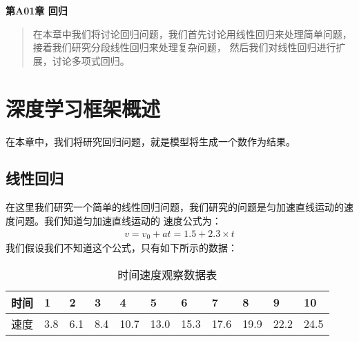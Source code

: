 \newpage
\maketitle
\begin{center}
\Large \textbf{第A01章 回归} \quad 
\end{center}
\begin{abstract}
在本章中我们将讨论回归问题，我们首先讨论用线性回归来处理简单问题，接着我们研究分段线性回归来处理复杂问题，
然后我们对线性回归进行扩展，讨论多项式回归。
\end{abstract}
\section{深度学习框架概述}
在本章中，我们将研究回归问题，就是模型将生成一个数作为结果。
\subsection{线性回归}
在这里我们研究一个简单的线性回归问题，我们研究的问题是匀加速直线运动的速度问题。我们知道匀加速直线运动的
速度公式为：
\begin{equation}
	\begin{aligned}
	v = v_{0} + at = 1.5 + 2.3 \times t
	\end{aligned}
	\label{chpA01-volacity-yjszxyd}
\end{equation}
我们假设我们不知道这个公式，只有如下所示的数据：
\begin{table}[h]
	\caption{时间速度观察数据表}
	\label{chpA01-tbl-v-t}
	\begin{spacing}{1.5}
	\begin{tabular}{|p{1cm}|p{0.5cm}|p{0.5cm}|p{0.5cm}|p{0.5cm}|p{0.5cm}|p{0.5cm}|p{0.5cm}|p{0.5cm}|p{0.5cm}|p{0.5cm}|} \hline
	时间 & 1 & 2 & 3 & 4 & 5 & 6 & 7 & 8 & 9 & 10 \\ \hline  
	速度 & 3.8 & 6.1 & 8.4 & 10.7 & 13.0 & 15.3 & 17.6 & 19.9 & 22.2 & 24.5 \\ \hline
	\end{tabular}
	\end{spacing}
\end{table}